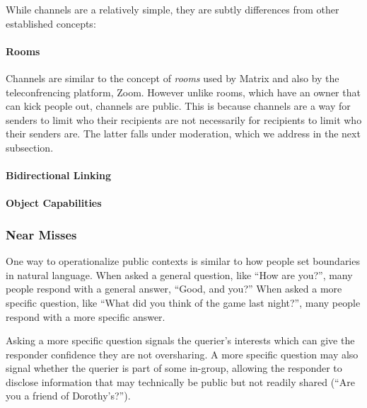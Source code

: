While channels are a relatively simple, they are subtly differences from other established concepts:


\paragraph{Rooms}

Channels are similar to the concept of \emph{rooms} used by Matrix and also by the teleconfrencing platform, Zoom.
However unlike rooms, which have an owner that can kick people out, channels are public. This is because channels are a way for senders to limit who their recipients are not necessarily for recipients to limit who their senders are. The latter falls under moderation, which we address in the next subsection.

\paragraph{Bidirectional Linking}


\paragraph{Object Capabilities}


\subsubsection{Near Misses}

One way to operationalize public contexts is similar to how people set boundaries in natural language.
When asked a general question, like ``How are you?'', many people respond with a general answer, ``Good, and you?''
When asked a more specific question, like ``What did you think of the game last night?'', many people respond with a more specific answer.

Asking a more specific question signals the querier's interests which can give the responder confidence they are not oversharing. A more specific question may also signal whether the querier is part of some in-group, allowing the responder to disclose information that may technically be public but not readily shared (``Are you a friend of Dorothy's?'').

